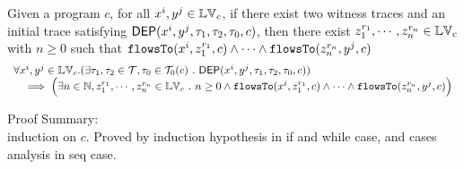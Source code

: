 \begin{thm}
\label{thm:flowsto_soundness}
Given a program ${c}$, for all  $ x^i, y^j \in \mathbb{LV}_{{c}}$, if there exist two witness traces 
and an initial trace satisfying $\mathsf{DEP}(x^i, y^j, \mathtt{\tau}_1, \mathtt{\tau}_2, \mathtt{\tau}_0, {c})$,
then
there exist $z_1^{r_1}, \cdots, z_n^{r_n} \in \mathbb{LV}_{{c}}$ with $n \geq 0$ such that   
$\mathtt{flowsTo}(x^i,  z_1^{r_1}, c) 
\land \cdots \land \mathtt{flowsTo}(z_n^{r_n}, y^j, c)$
%
\[
\begin{array}{l}
  \forall x^i, y^j \in \mathbb{LV}_{{c}}.
  (\exists \mathtt{\tau}_1, \mathtt{\tau}_2 \in \mathcal{T}, \mathtt{\tau}_0 \in \mathcal{T}_0(c) ~.~   \mathsf{DEP}(x^i, y^j, \mathtt{\tau}_1, \mathtt{\tau}_2, \mathtt{\tau}_0, {c}) )
  \\ \quad \implies
  \Big( \exists n \in \mathbb{N}, z_1^{r_1}, \cdots, z_n^{r_n} \in \mathbb{LV}_{{c}} ~.~   n \geq 0 \land
  \mathtt{flowsTo}(x^i,  z_1^{r_1}, c) 
  \land \cdots \land \mathtt{flowsTo}(z_n^{r_n}, y^j, c) \Big)
\end{array}
\]
\end{thm}
Proof Summary:
\\
induction on $c$. Proved by induction hypothesis in if and while case, and cases analysis in seq case.
%
%
